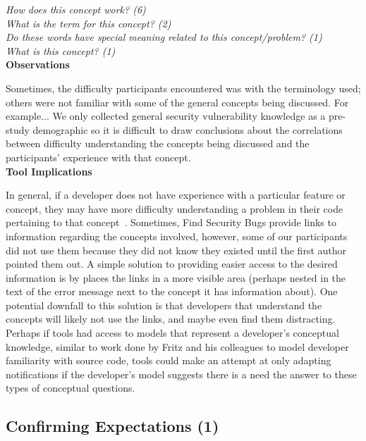 \documentclass[conference]{IEEEtran}
\begin{document}
\noindent\emph{How does this concept work? (6)} \\
\emph{What is the term for this concept? (2)} \\
\emph{Do these words have special meaning related to this concept/problem? (1)} \\
\emph{What is this concept? (1)} \\


\noindent\textbf{Observations}


Sometimes, the difficulty participants encountered was with the terminology used; others were not familiar with some of the general concepts being discussed. For example...
We only collected general security vulnerability knowledge as a pre-study demographic so it is difficult to draw conclusions about the correlations between difficulty understanding the concepts being discussed and the participants' experience with that concept.
\\

\noindent\textbf{Tool Implications}

In general, if a developer does not have experience with a particular feature or concept, they may have more difficulty understanding a problem in their code pertaining to that concept~\cite{wiedenbeck1993mental}.
Sometimes, Find Security Bugs provide links to information regarding the concepts involved, however, some of our participants did not use them because they did not know they existed until the first author pointed them out. 
A simple solution to providing easier access to the desired information is by places the links in a  more visible area (perhaps nested in the text of the error message next to the concept it has information about). 
One potential downfall to this solution is that developers that understand the concepts will likely not use the links, and maybe even find them distracting.   
Perhaps if tools had access to models that represent a developer's conceptual knowledge, similar to work done by Fritz and his colleagues to model developer familiarity with source code, tools could make an attempt at only adapting notifications if the developer's model suggests there is a need the answer to these types of conceptual questions.



\noindent\subsection{\textbf{Confirming Expectations (1)}}\label{ce}
\end{document}
